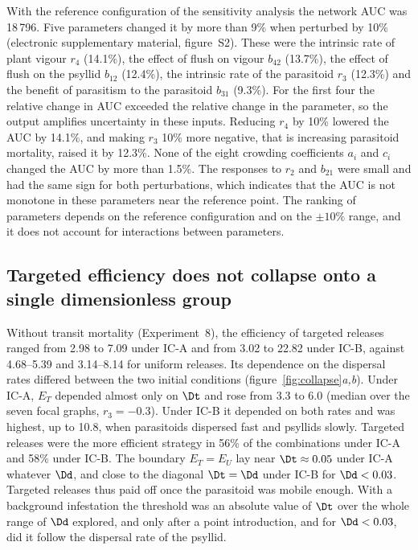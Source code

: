 With the reference configuration of the sensitivity analysis the network AUC was 18\,796. Five parameters changed it by more than 9\% when perturbed by 10\% (electronic supplementary material, figure~S2). These were the intrinsic rate of plant vigour $r_4$ (14.1\%), the effect of flush on vigour $b_{42}$ (13.7\%), the effect of flush on the psyllid $b_{12}$ (12.4\%), the intrinsic rate of the parasitoid $r_3$ (12.3\%) and the benefit of parasitism to the parasitoid $b_{31}$ (9.3\%). For the first four the relative change in AUC exceeded the relative change in the parameter, so the output amplifies uncertainty in these inputs. Reducing $r_4$ by 10\% lowered the AUC by 14.1\%, and making $r_3$ 10\% more negative, that is increasing parasitoid mortality, raised it by 12.3\%. None of the eight crowding coefficients $a_i$ and $c_i$ changed the AUC by more than 1.5\%. The responses to $r_2$ and $b_{21}$ were small and had the same sign for both perturbations, which indicates that the AUC is not monotone in these parameters near the reference point. The ranking of parameters depends on the reference configuration and on the $\pm10\%$ range, and it does not account for interactions between parameters.

\subsection{Targeted efficiency does not collapse onto a single dimensionless group}
\label{sec:res-collapse}

Without transit mortality (Experiment~8), the efficiency of targeted releases ranged from 2.98 to 7.09 under IC-A and from 3.02 to 22.82 under IC-B, against 4.68--5.39 and 3.14--8.14 for uniform releases. Its dependence on the dispersal rates differed between the two initial conditions (figure~\ref{fig:collapse}\emph{a,b}). Under IC-A, $E_T$ depended almost only on $\Dt$ and rose from 3.3 to 6.0 (median over the seven focal graphs, $r_3 = -0.3$). Under IC-B it depended on both rates and was highest, up to 10.8, when parasitoids dispersed fast and psyllids slowly. Targeted releases were the more efficient strategy in 56\% of the combinations under IC-A and 58\% under IC-B. The boundary $E_T = E_U$ lay near $\Dt \approx 0.05$ under IC-A whatever $\Dd$, and close to the diagonal $\Dt = \Dd$ under IC-B for $\Dd < 0.03$. Targeted releases thus paid off once the parasitoid was mobile enough. With a background infestation the threshold was an absolute value of $\Dt$ over the whole range of $\Dd$ explored, and only after a point introduction, and for $\Dd < 0.03$, did it follow the dispersal rate of the psyllid.

